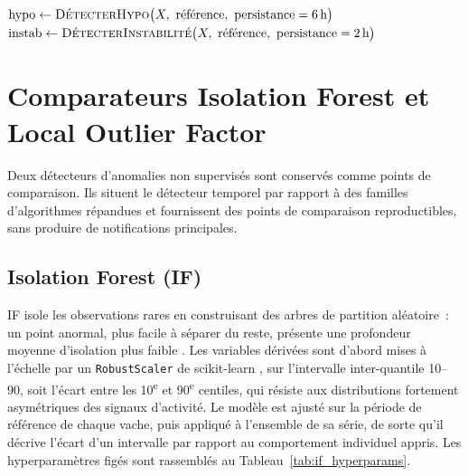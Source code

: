 \begin{algorithm}[H]
\caption{Fusion hiérarchique des branches HYPO et INSTABILITÉ, pour une vache}
\label{alg:fusion}
\BlankLine
$\mathrm{hypo} \leftarrow \textsc{DétecterHypo}\bigl(X,\ \text{référence},\ \text{persistance}=6\,\text{h}\bigr)$
$\mathrm{instab} \leftarrow \textsc{DétecterInstabilité}\bigl(X,\ \text{référence},\ \text{persistance}=2\,\text{h}\bigr)$
\BlankLine
{}
\BlankLine
{}
\end{algorithm}


\section{Comparateurs Isolation Forest et Local Outlier Factor}
\label{sec:comparateurs}
Deux détecteurs d'anomalies non supervisés sont conservés comme points de comparaison. Ils
situent le détecteur temporel par rapport à des familles d'algorithmes répandues et
fournissent des points de comparaison reproductibles, sans produire de notifications
principales.

\subsection{Isolation Forest (IF)}
IF isole les observations rares en construisant des arbres de partition
aléatoire~: un point anormal, plus facile à séparer du reste, présente une profondeur
moyenne d'isolation plus faible \citep{liu2008isolation}. Les variables dérivées sont
d'abord mises à l'échelle par un \texttt{RobustScaler} de scikit-learn
\citep{sklearn_api}, sur l'intervalle inter-quantile 10--90, soit l'écart entre les
10\textsuperscript{e} et 90\textsuperscript{e} centiles, qui résiste aux distributions fortement asymétriques des signaux d'activité. Le
modèle est ajusté sur la période de référence de chaque vache, puis appliqué à l'ensemble de sa
série, de sorte qu'il décrive l'écart d'un intervalle par rapport au comportement
individuel appris. Les hyperparamètres figés sont rassemblés au
Tableau~\ref{tab:if_hyperparams}.

